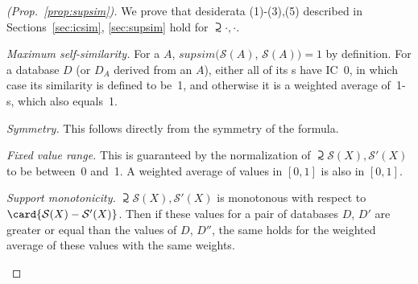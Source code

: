 \begin{proof} [(Prop.~\ref{prop:supsim})]
We prove that desiderata (1)-(3),(5) described in Sections~\ref{sec:icsim}, \ref{sec:supsim} hold for $\supsim{\cdot,\cdot}$.
\begin{compactenum}[(1)]
\item \emph{Maximum self-similarity.} For a \fset{} $A$,
$supsim(\mathcal{S}(A)$,\newline
$\mathcal{S}(A)) =1$ by definition. For a database $D$ (or $D_A$ derived from an \fset{} $A$), either all of its \fset{}s have IC~0, in which case its similarity is defined to be~1, and otherwise it is a weighted average of~1-s, which also equals~1.
\item \emph{Symmetry.} This follows directly from the symmetry of the formula.
\item \emph{Fixed value range.} This is guaranteed by the normalization of $\supsim{\mathcal{S}(X),\mathcal{S}'(X)}$ to be between~0 and~1. A weighted average of values in $[0,1]$ is also in $[0,1]$.\setcounter{enumi}{4}
\item \emph{Support monotonicity.} $\supsim{\mathcal{S}(X),\mathcal{S}'(X)}$ is monotonous with respect to $\card{\mathcal{S}(X)-\mathcal{S}'(X)}$. Then if these values for a pair of databases $D$, $D'$ are greater or equal than the values of $D$, $D''$, the same holds for the weighted average of these values with the same weights.\end{compactenum} \vspace{-3mm} \end{proof}




